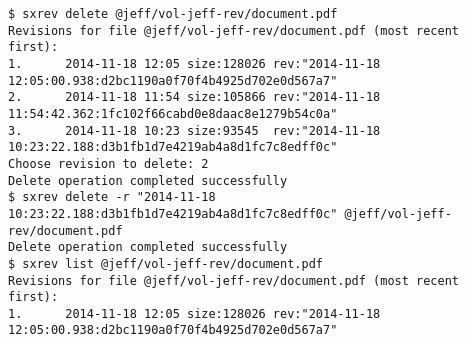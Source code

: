 \begin{lstlisting}
$ sxrev delete @jeff/vol-jeff-rev/document.pdf
Revisions for file @jeff/vol-jeff-rev/document.pdf (most recent first):
1.      2014-11-18 12:05 size:128026 rev:"2014-11-18 12:05:00.938:d2bc1190a0f70f4b4925d702e0d567a7"
2.      2014-11-18 11:54 size:105866 rev:"2014-11-18 11:54:42.362:1fc102f66cabd0e8daac8e1279b54c0a"
3.      2014-11-18 10:23 size:93545  rev:"2014-11-18 10:23:22.188:d3b1fb1d7e4219ab4a8d1fc7c8edff0c"
Choose revision to delete: 2
Delete operation completed successfully
$ sxrev delete -r "2014-11-18 10:23:22.188:d3b1fb1d7e4219ab4a8d1fc7c8edff0c" @jeff/vol-jeff-rev/document.pdf
Delete operation completed successfully
$ sxrev list @jeff/vol-jeff-rev/document.pdf
Revisions for file @jeff/vol-jeff-rev/document.pdf (most recent first):
1.      2014-11-18 12:05 size:128026 rev:"2014-11-18 12:05:00.938:d2bc1190a0f70f4b4925d702e0d567a7"
\end{lstlisting}
